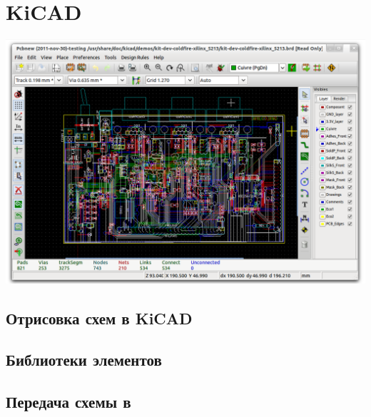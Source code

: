 \chapter{KiCAD}

\noindent\includegraphics[height=0.5\textheight]{kicad/kicad_pcbnew.png}



\section{Отрисовка схем в KiCAD}

\section{Библиотеки элементов}

\section{Передача схемы в \spice}


% 
% 
% 
% 
% 
% 
% 
% 
% 
% 
% 
% 
% 
% 
% 
